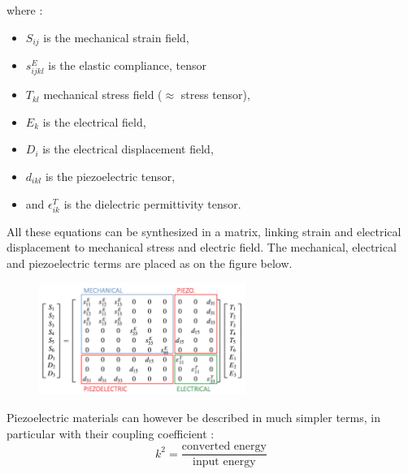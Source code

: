 where : 
\begin{itemize}
    \item $S_{ij}$ is the mechanical strain field,
    \item $s_{ijkl}^E$ is the elastic compliance, tensor
    \item $T_{kl}$ mechanical stress field ($\approx$ stress tensor),
    \item $E_k$ is the electrical field,
    \item $D_i$ is the electrical displacement field,
    \item $d_{ikl}$ is the piezoelectric tensor,
    \item and $\epsilon_{ik}^T$ is the dielectric permittivity tensor.
\end{itemize}
All these equations can be synthesized in a matrix, linking strain and electrical displacement to mechanical stress and electric field. The mechanical, electrical and piezoelectric terms are placed as on the figure below.
\begin{figure}[H]
    \centering
    \includegraphics[width = 0.6\textwidth]{L2/img/pizzo}
\end{figure}

Piezoelectric materials can however be described in much simpler terms, in particular with their coupling coefficient : 
$$k^2 = \frac{\text{converted energy}}{\text{input energy}}$$

